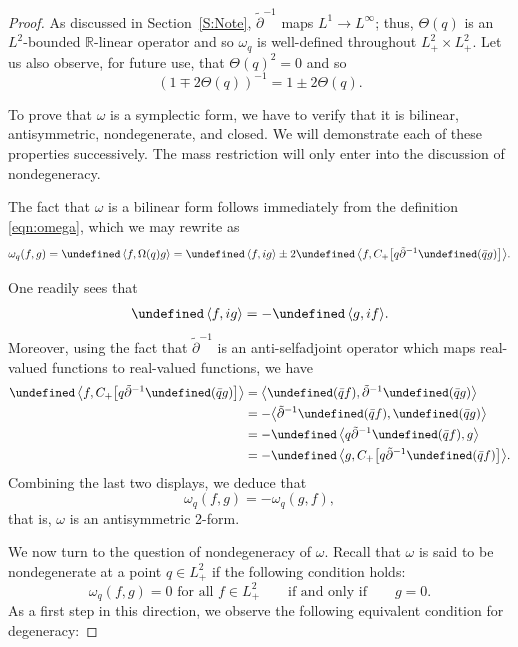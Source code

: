 \documentclass{amsart}
\numberwithin{equation}{section}
\theoremstyle{definition}
\newcommand{\om}{\omega}
\newcommand{\Om}{\Omega}
\newcommand{\R}{\mathbb{R}}
\newcommand{\dd}{\partial}
\newcommand{\lan}{\langle}
\newcommand{\ran}{\rangle}
\let\Re=\undefined\DeclareMathOperator{\Re}{Re}
\begin{document}
\begin{proof}
As discussed in Section~\ref{S:Note}, $\tilde\partial^{-1}$ maps $L^1\to L^\infty$; thus, $\Theta(q)$ is an $L^2$-bounded $\R$-linear operator and so $\omega_q$ is well-defined throughout $L^2_+\times L^2_+$.  Let us also observe, for future use, that $\Theta(q)^2=0$ and so
\begin{equation}\label{eqn:S_inverse}
(1\mp2 \Theta(q))^{-1}=1\pm2 \Theta(q).
\end{equation}



To prove that $\om$ is a symplectic form, we have to verify that it is bilinear, antisymmetric, nondegenerate, and closed. We will demonstrate each of these properties successively.  The mass restriction will only enter into the discussion of nondegeneracy.

The fact that $\om$ is a bilinear form follows immediately from the definition \eqref{eqn:omega}, which we may rewrite as
\begin{align*}
\om_q(f,g)=\Re\,\lan f,\Om (q)g\ran = \Re\, \lan f,ig\ran \pm 2\Re\, \bigl\lan f,C_+\bigl[q\tilde{\dd}^{-1}\Re(\bar{q}g) \bigr]\bigr\ran.
\end{align*}

One readily sees that 
\begin{align*}
 \Re\, \lan f,ig\ran  = - \Re\, \lan g, if\ran.
\end{align*}
Moreover, using the fact that $\tilde{\dd}^{-1}$ is an anti-selfadjoint operator which maps real-valued functions to real-valued functions, we have
\begin{align*}
\Re\,\bigl\lan f, C_+\bigl[q\tilde{\dd}^{-1}\Re(\bar{q}g)\bigr]\bigr\ran&=\bigl\lan\Re (\bar{q}f),\tilde{\dd}^{-1}\Re(\bar{q}g)\bigr\ran\\
&=-\bigl\lan \tilde{\dd}^{-1}\Re(\bar{q}f),\Re(\bar{q}g)\bigr\ran\\
&=-\Re\,\bigl\lan q\tilde{\dd}^{-1}\Re(\bar{q}f),g\bigr\ran\\
&=-\Re\, \bigl\lan g, C_+\bigl[q\tilde{\dd}^{-1}\Re(\bar{q}f)\bigr]\bigr\ran.
\end{align*}
Combining the last two displays, we deduce that  
$$
\om_q(f,g)=-\om_q(g,f),
$$
that is, $\om$ is an antisymmetric 2-form.

We now turn to the question of nondegeneracy of $\om$.  Recall that $\om$ is said to be nondegenerate at a point $q\in L^2_+$ if the following condition holds:
$$
\om_q(f,g)= 0 \text{ for all $f\in L^2_+$} \qquad\text{if and only if} \qquad g=0.
$$
As a first step in this direction, we observe the following equivalent condition for degeneracy:


\end{proof}
\end{document}
